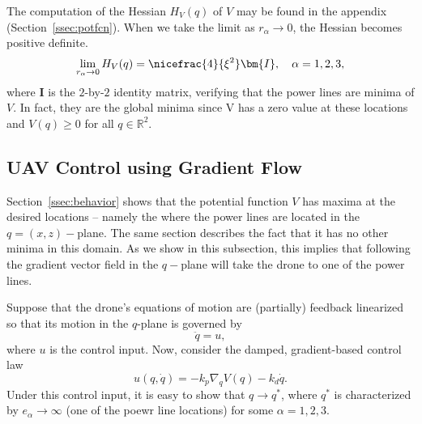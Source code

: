 The computation of the Hessian $H_V(q)$ of $V$ may be found in
the appendix (Section~\ref{ssec:potfcn}). When we take the limit as $r_\alpha
\rightarrow 0$, the Hessian becomes positive definite.
\[
    \lim_{r_\alpha \rightarrow 0} H_V(q) = \nicefrac{4}{\xi^2}\bm{I}, \quad
    \alpha = 1, 2, 3,
\]
where $\bm{I}$ is the $2$-by-$2$ identity matrix, verifying that the power lines
are minima of $V$. In fact, they are the global minima since V has a zero value
at these locations and $V(q) \geq 0$ for all $q \in \mathbb{R}^2$.


\subsection{UAV Control using Gradient Flow}

Section~\ref{ssec:behavior} shows that the potential function $V$ has maxima at
the desired locations -- namely the where the power lines are located in the
$q=(x, z)-$plane. The same section describes the fact that it has no other
minima in this domain. As we show in this subsection, this implies that
following the gradient vector field in the $q-$plane will take the drone to one
of the power lines.

Suppose that the drone's equations of motion are (partially) feedback linearized
so that its motion in the $q$-plane is governed by 
%
\begin{equation}
    \ddot{q} = u,
    \label{eq:double_int}
\end{equation}
%
where $u$ is the control input. Now, consider the damped, gradient-based control
law 
%
\begin{equation}
    u(q, \dot{q}) = -k_p\nabla_qV(q) - k_d\dot{q}. 
    \label{eq:grad-ctrl}
\end{equation}
%
Under this control input, it is easy to show that $q \rightarrow q^\ast$,
where $q^\ast$ is characterized by $e_\alpha \rightarrow \infty$ (one of the
poewr line locations) for some $\alpha = 1,2,3$. 

